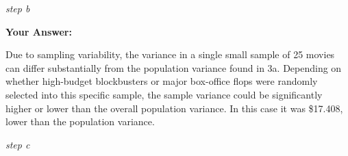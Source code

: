 \documentclass[
]{article}
\newenvironment{Shaded}{\begin{snugshade}}{\end{snugshade}}
\newcommand{\AttributeTok}[1]{\textcolor[rgb]{0.13,0.29,0.53}{#1}}
\newcommand{\ControlFlowTok}[1]{\textcolor[rgb]{0.13,0.29,0.53}{\textbf{#1}}}
\newcommand{\DecValTok}[1]{\textcolor[rgb]{0.00,0.00,0.81}{#1}}
\newcommand{\FunctionTok}[1]{\textcolor[rgb]{0.13,0.29,0.53}{\textbf{#1}}}
\newcommand{\NormalTok}[1]{#1}
\newcommand{\OtherTok}[1]{\textcolor[rgb]{0.56,0.35,0.01}{#1}}
\newcommand{\SpecialCharTok}[1]{\textcolor[rgb]{0.81,0.36,0.00}{\textbf{#1}}}
\begin{document}
\emph{step b}

\begin{Shaded}
\end{Shaded}

\textbf{Your Answer:}

Due to sampling variability, the variance in a single small sample of 25
movies can differ substantially from the population variance found in
3a. Depending on whether high-budget blockbusters or major box-office
flops were randomly selected into this specific sample, the sample
variance could be significantly higher or lower than the overall
population variance. In this case it was \$17.408, lower than the
population variance.

\emph{step c}

\begin{Shaded}
\end{Shaded}
\end{document}
